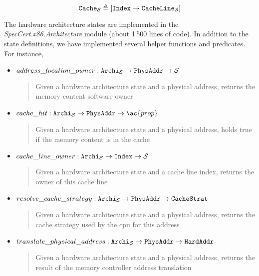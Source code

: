 
\[
  \texttt{Cache}_{\mathcal{S}} \triangleq [ \texttt{Index} \rightarrow
  \texttt{CacheLine}_{\mathcal{S}} ]
\]

The hardware architecture states are implemented in the
\emph{SpecCert.x86.Archi\-tecture} module (about 1\,500 lines of code).
%
In addition to the state definitions, we have implemented several helper
functions and predicates.
%
For instance,
%
\begin{itemize}
\item
  $address\_location\_owner : \texttt{Archi}_{\mathcal{S}} \rightarrow
  \texttt{PhysAddr} \rightarrow \mathcal{S}$
  \begin{quote}
    \small Given a hardware architecture state and a physical address, returns
    the memory content software owner
  \end{quote}
%
\item
  $cache\_hit : \texttt{Archi}_{\set{S}} \rightarrow \texttt{PhysAddr}
  \rightarrow \ac{prop}$
  \begin{quote}
    \small Given a hardware architecture state and a physical address, holds
    true if the memory content is in the cache
  \end{quote}
%
\item
  $cache\_line\_owner : \texttt{Archi}_{\mathcal{S}} \rightarrow \texttt{Index}
  \rightarrow \mathcal{S}$
  \begin{quote}
    \small Given a hardware architecture state and a cache line index, returns
    the owner of this cache line
  \end{quote}
%
\item
  $resolve\_cache\_strategy : \texttt{Archi}_{\mathcal{S}} \rightarrow
  \texttt{PhysAddr} \rightarrow \texttt{CacheStrat}$
  \begin{quote}
    \small Given a hardware architecture state and a physical address, returns
    the cache strategy used by the \ac{cpu} for this address
  \end{quote}
%
\item
  $translate\_physical\_address : \texttt{Archi}_{\mathcal{S}} \rightarrow
  \texttt{PhysAddr} \rightarrow \texttt{HardAddr}$
  \begin{quote}
    \small Given a hardware architecture state and a physical address, returns
    the result of the memory controller address translation
  \end{quote}
\end{itemize}

